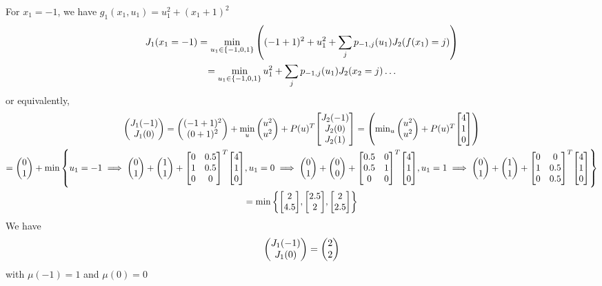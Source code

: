 \documentclass[]{article}
\begin{document}
For $x_1 = -1$, we have $g_1(x_1,u_1) = u_1^2 + (x_1+1)^2$
\begin{multline}
    J_1(x_1=-1) = \min_{u_1 \in \{-1,0,1\}} \qty(
        (-1+1)^2 + u_1^2 + \sum_{j} p_{-1, j}(u_1) J_2(f(x_1)=j)
    ) \\
    = \min_{u_1 \in \{-1,0,1\}} u_1^2 + \sum_{j} p_{-1, j}(u_1) J_2(x_2=j)
    \dots
\end{multline}
or equivalently,
\begin{multline}
    \mqty(J_1(-1)\\ J_1(0)) = \mqty((-1+1)^2\\(0+1)^2) +
        \min_{u} \mqty(u^2\\u^2) + P(u)^T \mqty[J_2(-1)\\J_2(0)\\J_2(1)] = \mqty(
        \min_{u} \mqty(u^2\\u^2) + P(u)^T \mqty[4\\1\\0]
    )\\
    = \mqty(0\\1) + \min \qty{
        u_1=-1 \implies \mqty(0\\1) + \mqty(1\\1) + \mqty[
        0 & 0.5\\
        1 & 0.5\\
        0 & 0
    ]^T \mqty[4\\1\\0],
    u_1 = 0 \implies \mqty(0\\1) + \mqty(0\\0) +  \mqty[
        0.5 & 0\\
        0.5 & 1\\
        0 & 0
    ]^T \mqty[4\\1\\0],
    u_1 = 1 \implies \mqty(0\\1) + \mqty(1\\1) +  \mqty[
        0 & 0\\
        1 & 0.5\\
        0 & 0.5
    ]^T\mqty[4\\1\\0]
    } \\
    = \min \qty{
        \mqty[2\\4.5],
        \mqty[2.5\\2],
        \mqty[2\\2.5]
    }
\end{multline}
We have \[
    \mqty(J_1(-1)\\ J_1(0)) = \mqty(2\\2)
\] with $\mu(-1) = 1$ and $\mu(0) = 0$
\end{document}
